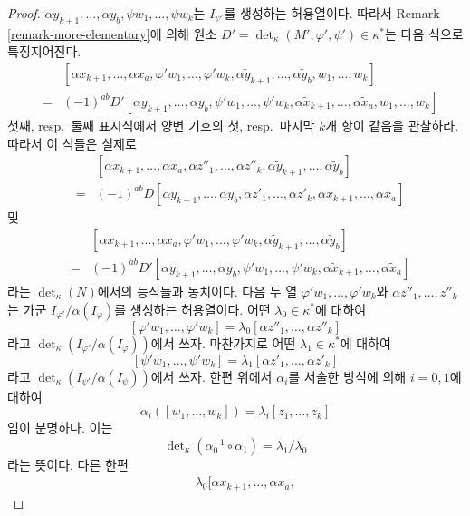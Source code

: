 \begin{proof}
$\alpha y_{k + 1}, \ldots, \alpha y_b, \psi w_1, \ldots, \psi w_k$는
$I_{\psi'}$를 생성하는 허용열이다. 따라서 Remark
\ref{remark-more-elementary}에 의해 원소
$D' = \det_\kappa(M', \varphi', \psi') \in \kappa^*$는 다음 식으로
특징지어진다.
\begin{eqnarray*}
& &
[\alpha x_{k + 1}, \ldots, \alpha x_a,
\varphi' w_1, \ldots, \varphi' w_k,
\alpha \tilde y_{k + 1}, \ldots, \alpha \tilde y_b,
w_1, \ldots, w_k]
\\
& = &
(-1)^{ab} D'
[\alpha y_{k + 1}, \ldots, \alpha y_b,
\psi' w_1, \ldots, \psi' w_k,
\alpha \tilde x_{k + 1}, \ldots, \alpha \tilde x_a,
w_1, \ldots, w_k]
\end{eqnarray*}
첫째, resp.\ 둘째 표시식에서 양변 기호의 첫, resp.\ 마지막 $k$개
항이 같음을 관찰하라. 따라서 이 식들은
실제로
\begin{eqnarray*}
& &
[\alpha x_{k + 1}, \ldots, \alpha x_a,
\alpha z''_1, \ldots, \alpha z''_k,
\alpha \tilde y_{k + 1}, \ldots, \alpha \tilde y_b] \\
& = &
(-1)^{ab} D
[\alpha y_{k + 1}, \ldots, \alpha y_b,
\alpha z'_1, \ldots, \alpha z'_k,
\alpha \tilde x_{k + 1}, \ldots, \alpha \tilde x_a]
\end{eqnarray*}
및
\begin{eqnarray*}
& &
[\alpha x_{k + 1}, \ldots, \alpha x_a,
\varphi' w_1, \ldots, \varphi' w_k,
\alpha \tilde y_{k + 1}, \ldots, \alpha \tilde y_b]
\\
& = &
(-1)^{ab} D'
[\alpha y_{k + 1}, \ldots, \alpha y_b,
\psi' w_1, \ldots, \psi' w_k,
\alpha \tilde x_{k + 1}, \ldots, \alpha \tilde x_a]
\end{eqnarray*}
라는 $\det_\kappa(N)$에서의 등식들과 동치이다. 다음 두 열
$\varphi' w_1, \ldots, \varphi' w_k$와
$\alpha z''_1, \ldots, z''_k$는 가군
$I_{\varphi'}/\alpha(I_\varphi)$를 생성하는 허용열이다. 어떤
$\lambda_0 \in \kappa^*$에 대하여
$$
[\varphi' w_1, \ldots, \varphi' w_k]
= \lambda_0 [\alpha z''_1, \ldots, \alpha z''_k]
$$
라고 $\det_\kappa(I_{\varphi'}/\alpha(I_\varphi))$에서 쓰자. 마찬가지로
어떤 $\lambda_1 \in \kappa^*$에 대하여
$$
[\psi' w_1, \ldots, \psi' w_k]
= \lambda_1 [\alpha z'_1, \ldots, \alpha z'_k]
$$
라고 $\det_\kappa(I_{\psi'}/\alpha(I_\psi))$에서 쓰자. 한편 위에서
$\alpha_i$를 서술한 방식에 의해 $i = 0, 1$에 대하여
$$
\alpha_i([w_1, \ldots, w_k]) = \lambda_i[z_1, \ldots, z_k]
$$
임이 분명하다. 이는
$$
\det\nolimits_\kappa(\alpha_0^{-1} \circ \alpha_1)
=
\lambda_1/\lambda_0
$$
라는 뜻이다. 다른 한편
\begin{eqnarray*}
& &
\lambda_0 [\alpha x_{k + 1}, \ldots, \alpha x_a,

\end{eqnarray*}
\end{proof}
